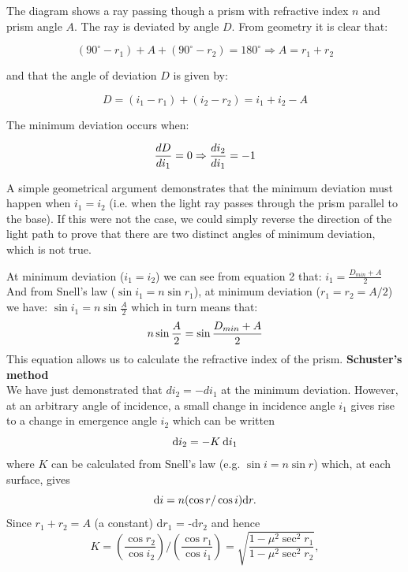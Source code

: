 \documentclass[12pt]{article}
\newcommand{\degree}{^\circ}
\begin{document}
The diagram shows a ray passing though a prism with refractive index $n$
and prism angle $A$. The ray is deviated by angle $D$. From geometry
it is clear that:\\
\begin{center}
\begin{equation}
(90 \degree - r_1) + A + (90\degree - r_2)=180\degree 
\Rightarrow A=r_1 + r_2
\end{equation}
\end{center}
and that the angle of deviation $D$ is given by:
\begin{center}
\begin{equation}
D=(i_1 - r_1) + (i_2 - r_2) = i_1 + i_2 - A
\end{equation}
\end{center}
The minimum deviation occurs when:
\begin{center}
\begin{equation}
{\Large
\frac{dD}{d i_1}=0 \Rightarrow \frac{d i_2}{d i_1}=-1
}
\end{equation}
\end{center}

A simple geometrical argument demonstrates that the minimum deviation
must happen when $i_1 = i_2$ (i.e. when the light ray passes
through the prism parallel to the base). If this were not the case, we
could simply reverse the direction of the light path to prove that
there are two distinct angles of minimum deviation, which is not true.

At minimum deviation ($i_1=i_2$) we can see from equation 2 that:
$i_1=\frac{D_{min}+A}{2}$\\

And from Snell's law ($\sin i_1=n\sin r_1$), at minimum deviation
($r_1=r_2=A/2$) we have:
$\sin i_1=n\sin\frac{A}{2}$
which in turn means that:
\begin{equation}
{\Large
n\sin\frac{A}{2}=\sin\frac{D_{min}+A}{2}
}
\end{equation}
This equation allows us to calculate the refractive index of the
prism.
\newpage
{\large{\bf Schuster's method}}\\
We have just demonstrated that $d i_2 = -d i_1$ at the minimum
deviation. However, at an arbitrary angle of incidence, a small change
in incidence angle $i_1$ gives rise to a change in 
emergence angle $i_2$ which can be written
\[   \mbox{\rm d}i_2 = - K\:\mbox{\rm d}i_1    \]
where $K$ can be calculated from Snell's law
(e.g. $\sin i =n \sin r $) which, at each surface, gives
\[  \mbox{\rm d}i = n (\cos r/\cos i)\mbox{\rm d}r.   \]
Since $r_1 + r_2 = A$ (a constant) d$r_1$ = -d$r_2$ and hence
\[  K = \left(\frac{\cos r_2}{\cos i_2}\right) / 
    \left(\frac{\cos r_1}{\cos i_1}\right)       =
     \sqrt{\frac{1-\mu^2\sec^2 r_1}{1-\mu^2\sec^2 r_2}},  \]
\end{document}
